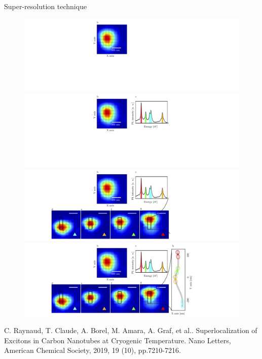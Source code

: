 \documentclass[xcolor = {dvipsnames}]{beamer}
\begin{document}
\begin{frame}{Super-resolution technique}
	\begin{figure}
		\begin{overprint}
		 \centering\includegraphics[width=1.05\textwidth]{images/s1}
		\onslide<2>\centering\includegraphics[width=1.05\textwidth]{images/s2}
		\onslide<3> \centering\includegraphics[width=1.05\textwidth]{images/s3}
		\onslide<4>\centering\includegraphics[width=1.05\textwidth]{images/s4}
		\end{overprint}
	\end{figure}
	\tiny C. Raynaud, T. Claude, A. Borel, M. Amara, A. Graf, et al.. Superlocalization of Excitons in Carbon Nanotubes at Cryogenic Temperature. Nano Letters, American Chemical Society, 2019, 19 (10), pp.7210-7216.
\end{frame}
\end{document}
